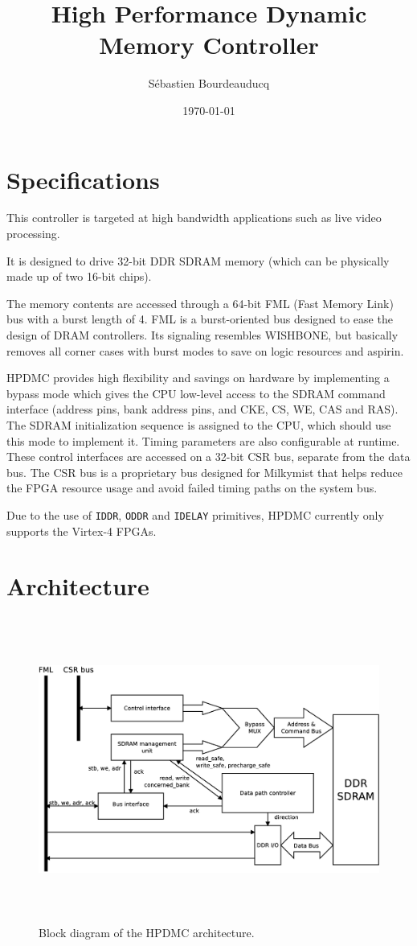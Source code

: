 \documentclass[a4paper,11pt]{article}
\title{High Performance Dynamic Memory Controller}
\author{S\'ebastien Bourdeauducq}
\date{\today}
\begin{document}
\setlength{\parindent}{0pt}
\setlength{\parskip}{5pt}
\maketitle{}
\section{Specifications}
This controller is targeted at high bandwidth applications such as live video processing.

It is designed to drive 32-bit DDR SDRAM memory (which can be physically made up of two 16-bit chips).

The memory contents are accessed through a 64-bit FML (Fast Memory Link) bus with a burst length of 4. FML is a burst-oriented bus designed to ease the design of DRAM controllers. Its signaling resembles WISHBONE, but basically removes all corner cases with burst modes to save on logic resources and aspirin.

HPDMC provides high flexibility and savings on hardware by implementing a bypass mode which gives the CPU low-level access to the SDRAM command interface (address pins, bank address pins, and CKE, CS, WE, CAS and RAS). The SDRAM initialization sequence is assigned to the CPU, which should use this mode to implement it. Timing parameters are also configurable at runtime. These control interfaces are accessed on a 32-bit CSR bus, separate from the data bus. The CSR bus is a proprietary bus designed for Milkymist that helps reduce the FPGA resource usage and avoid failed timing paths on the system bus.

Due to the use of \verb!IDDR!, \verb!ODDR! and \verb!IDELAY! primitives, HPDMC currently only supports the Virtex-4 FPGAs.

\section{Architecture}

\begin{figure}[H]
\centering
\includegraphics[height=100mm]{blockdiagram.eps}
\caption{Block diagram of the HPDMC architecture.}\label{fig:blockdiagram}
\end{figure}
\end{document}
